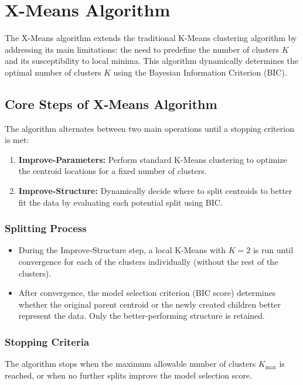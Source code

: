 \section*{X-Means Algorithm}

The X-Means algorithm extends the traditional K-Means clustering algorithm by addressing its main limitations:
the need to predefine the number of clusters \( K \)
and its susceptibility to local minima. This algorithm dynamically determines the optimal number of clusters \( K \) using the Bayesian Information Criterion (BIC).

\subsection*{Core Steps of X-Means Algorithm}

The algorithm alternates between two main operations until a stopping criterion is met:

\begin{enumerate}
    \item \textbf{Improve-Parameters:} Perform standard K-Means clustering to optimize the centroid locations for a fixed number of clusters.
    \item \textbf{Improve-Structure:} Dynamically decide where to split centroids to better fit the data by evaluating each potential split using BIC.
\end{enumerate}

\subsubsection*{Splitting Process}
\begin{itemize}
    \item During the Improve-Structure step, a local K-Means with \( K = 2 \) is run until convergence for each of the clusters individually (without the rest of the clusters).
    \item After convergence, the model selection criterion (BIC score) determines whether the original parent centroid or the newly created children better represent the data. Only the better-performing structure is retained.
\end{itemize}

\subsubsection*{Stopping Criteria}
The algorithm stops when the maximum allowable number of clusters \( K_{\text{max}} \) is reached, or when no further splits improve the model selection score.

